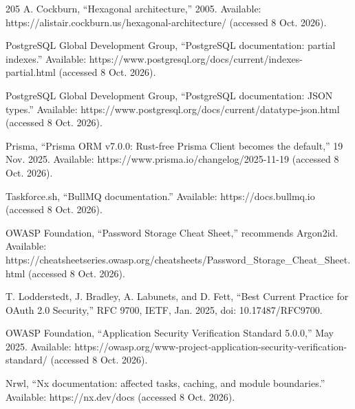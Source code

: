 \begin{thebibliography}{205}
 A. Cockburn, ``Hexagonal architecture,'' 2005. Available: https:/\allowbreak{}/\allowbreak{}alistair.\allowbreak{}cockburn.\allowbreak{}us/\allowbreak{}hexagonal-\allowbreak{}architecture/ (accessed 8 Oct. 2026).

 PostgreSQL Global Development Group, ``PostgreSQL documentation: partial indexes.'' Available: https:/\allowbreak{}/\allowbreak{}www.\allowbreak{}postgresql.\allowbreak{}org/\allowbreak{}docs/\allowbreak{}current/\allowbreak{}indexes-\allowbreak{}partial.\allowbreak{}html (accessed 8 Oct. 2026).

 PostgreSQL Global Development Group, ``PostgreSQL documentation: JSON types.'' Available: https:/\allowbreak{}/\allowbreak{}www.\allowbreak{}postgresql.\allowbreak{}org/\allowbreak{}docs/\allowbreak{}current/\allowbreak{}datatype-\allowbreak{}json.\allowbreak{}html (accessed 8 Oct. 2026).

 Prisma, ``Prisma ORM v7.0.0: Rust-free Prisma Client becomes the default,'' 19 Nov. 2025. Available: https:/\allowbreak{}/\allowbreak{}www.\allowbreak{}prisma.\allowbreak{}io/\allowbreak{}changelog/\allowbreak{}2025-\allowbreak{}11-\allowbreak{}19 (accessed 8 Oct. 2026).

 Taskforce.\allowbreak{}sh, ``BullMQ documentation.\allowbreak{}'' Available: https:/\allowbreak{}/\allowbreak{}docs.\allowbreak{}bullmq.\allowbreak{}io (accessed 8 Oct. 2026).

 OWASP Foundation, ``Password Storage Cheat Sheet,'' recommends Argon2id. Available: https:/\allowbreak{}/\allowbreak{}cheatsheetseries.\allowbreak{}owasp.\allowbreak{}org/\allowbreak{}cheatsheets/\allowbreak{}Password\_\allowbreak{}Storage\_\allowbreak{}Cheat\_\allowbreak{}Sheet.\allowbreak{}html (accessed 8 Oct. 2026).

 T. Lodderstedt, J. Bradley, A. Labunets, and D. Fett, ``Best Current Practice for OAuth 2.0 Security,'' RFC 9700, IETF, Jan. 2025, doi: 10.\allowbreak{}17487/\allowbreak{}RFC9700.

 OWASP Foundation, ``Application Security Verification Standard 5.0.0,'' May 2025. Available: https:/\allowbreak{}/\allowbreak{}owasp.\allowbreak{}org/\allowbreak{}www-\allowbreak{}project-\allowbreak{}application-\allowbreak{}security-\allowbreak{}verification-\allowbreak{}standard/ (accessed 8 Oct. 2026).

 Nrwl, ``Nx documentation: affected tasks, caching, and module boundaries.\allowbreak{}'' Available: https:/\allowbreak{}/\allowbreak{}nx.\allowbreak{}dev/\allowbreak{}docs (accessed 8 Oct. 2026).


\end{thebibliography}
